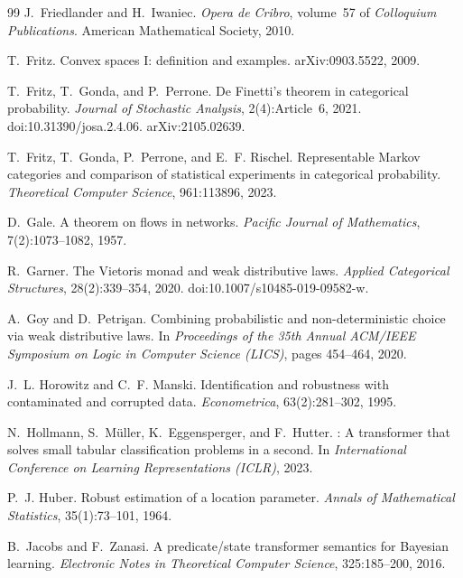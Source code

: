 \documentclass[11pt]{article}
\theoremstyle{definition}
\theoremstyle{remark}
\begin{document}
\begin{thebibliography}{99}
J.~Friedlander and H.~Iwaniec.
\newblock \emph{Opera de Cribro}, volume~57 of \emph{Colloquium Publications}.
\newblock American Mathematical Society, 2010.

T.~Fritz.
\newblock Convex spaces {I}: definition and examples.
\newblock arXiv:0903.5522, 2009.

T.~Fritz, T.~Gonda, and P.~Perrone.
\newblock De {F}inetti's theorem in categorical probability.
\newblock \emph{Journal of Stochastic Analysis}, 2(4):Article~6, 2021.
\newblock doi:10.31390/josa.2.4.06. arXiv:2105.02639.

T.~Fritz, T.~Gonda, P.~Perrone, and E.~F. Rischel.
\newblock Representable {M}arkov categories and comparison of statistical experiments in categorical
  probability.
\newblock \emph{Theoretical Computer Science}, 961:113896, 2023.

D.~Gale.
\newblock A theorem on flows in networks.
\newblock \emph{Pacific Journal of Mathematics}, 7(2):1073--1082, 1957.

R.~Garner.
\newblock The {V}ietoris monad and weak distributive laws.
\newblock \emph{Applied Categorical Structures}, 28(2):339--354, 2020.
\newblock doi:10.1007/s10485-019-09582-w.

A.~Goy and D.~Petri\c{s}an.
\newblock Combining probabilistic and non-deterministic choice via weak distributive laws.
\newblock In \emph{Proceedings of the 35th Annual ACM/IEEE Symposium on Logic in Computer Science
  (LICS)}, pages 454--464, 2020.

J.~L. Horowitz and C.~F. Manski.
\newblock Identification and robustness with contaminated and corrupted data.
\newblock \emph{Econometrica}, 63(2):281--302, 1995.

N.~Hollmann, S.~M\"uller, K.~Eggensperger, and F.~Hutter.
: A transformer that solves small tabular classification problems in a second.
\newblock In \emph{International Conference on Learning Representations (ICLR)}, 2023.

P.~J. Huber.
\newblock Robust estimation of a location parameter.
\newblock \emph{Annals of Mathematical Statistics}, 35(1):73--101, 1964.

B.~Jacobs and F.~Zanasi.
\newblock A predicate/state transformer semantics for {B}ayesian learning.
\newblock \emph{Electronic Notes in Theoretical Computer Science}, 325:185--200, 2016.


\end{thebibliography}
\end{document}
